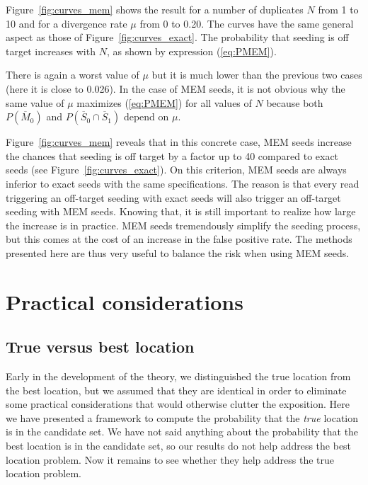 \documentclass{article}
\begin{document}
Figure~\ref{fig:curves_mem} shows the result for a number of duplicates $N$
from 1 to 10 and for a divergence rate $\mu$ from 0 to 0.20. The curves
have the same general aspect as those of Figure~\ref{fig:curves_exact}. The
probability that seeding is off target increases with $N$, as shown by
expression (\ref{eq:PMEM}).

There is again a  worst value of $\mu$ but it is much lower than the
previous two cases (here it is close to 0.026). In the case of MEM seeds,
it is not obvious why the same value of $\mu$ maximizes (\ref{eq:PMEM})
for all values of $N$ because both $P(\overline{M}_0)$ and
$P(\overline{S}_0 \cap \overline{S}_1)$ depend on $\mu$.

Figure~\ref{fig:curves_mem} reveals that in this concrete case, MEM seeds
increase the chances that seeding is off target by a factor up to 40
compared to exact seeds (see Figure~\ref{fig:curves_exact}). On this
criterion, MEM seeds are always inferior to exact seeds with the same
specifications. The reason is that every read triggering an off-target
seeding with exact seeds will also trigger an off-target seeding with MEM
seeds. Knowing that, it is still important to realize how large the
increase is in practice. MEM seeds tremendously simplify the seeding
process, but this comes at the cost of an increase in the false positive
rate. The methods presented here are thus very useful to balance the
risk when using MEM seeds.

\section{Practical considerations}
\label{sec_practical}

\subsection{True versus best location}
\label{sec:truevsbest}

Early in the development of the theory, we distinguished the true location
from the best location, but we assumed that they are identical in order to
eliminate some practical considerations that would otherwise clutter the
exposition. Here we have presented a framework to compute the probability
that the \emph{true} location is in the candidate set. We have not said
anything about the probability that the best location is in the candidate
set, so our results do not help address the best location problem. Now it
remains to see whether they help address the true location problem.
\end{document}
